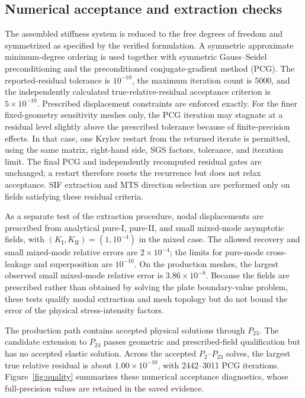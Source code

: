\documentclass[11pt]{article}
\newcommand{\SyntheticRelativeError}{3.86\times10^{-8}}
\newcommand{\MaxTrueResidual}{1.00\times10^{-10}}
\begin{document}
\subsection{Numerical acceptance and extraction checks}
The assembled stiffness system is reduced to the free degrees of
freedom and symmetrized as specified by the verified formulation.
A symmetric approximate minimum-degree ordering is used together
with symmetric Gauss--Seidel preconditioning and the
preconditioned conjugate-gradient method (PCG). The reported-residual
tolerance is $10^{-10}$, the maximum iteration count is 5000, and
the independently calculated true-relative-residual acceptance
criterion is $5\times10^{-10}$. Prescribed displacement
constraints are enforced exactly.
For the finer fixed-geometry sensitivity meshes only, the PCG iteration
may stagnate at a residual level slightly above the prescribed tolerance
because of finite-precision effects. In that case, one Krylov restart
from the returned iterate is permitted, using the
same matrix, right-hand side, SGS factors, tolerance, and iteration limit.
The final PCG and independently recomputed residual gates are unchanged;
a restart therefore resets the recurrence but does not relax acceptance.
SIF extraction and MTS direction selection are performed
only on fields satisfying these residual criteria.

As a separate test of the extraction procedure, nodal
displacements are prescribed from analytical pure-I, pure-II, and
small mixed-mode asymptotic fields, with
$(K_{\mathrm{I}},K_{\mathrm{II}})=(1,10^{-4})$ in the mixed case.
The allowed recovery and small mixed-mode relative errors are
$2\times10^{-4}$; the limits for pure-mode cross-leakage and
superposition are $10^{-10}$. On the production meshes, the largest
observed small mixed-mode relative error is
$\SyntheticRelativeError$. Because the fields are prescribed rather
than obtained by solving the plate boundary-value problem, these
tests qualify modal extraction and mesh topology but do not bound
the error of the physical stress-intensity factors.

The production path contains accepted physical solutions through
$P_{23}$. The candidate extension to $P_{24}$ passes geometric
and prescribed-field qualification but has no accepted elastic
solution. Across the accepted $P_2$--$P_{23}$ solves, the
largest true relative residual is about $\MaxTrueResidual$,
with 2442--3011 PCG iterations. Figure~\ref{fig:quality}
summarizes these numerical acceptance diagnostics, whose
full-precision values are retained in the saved evidence.
\end{document}

